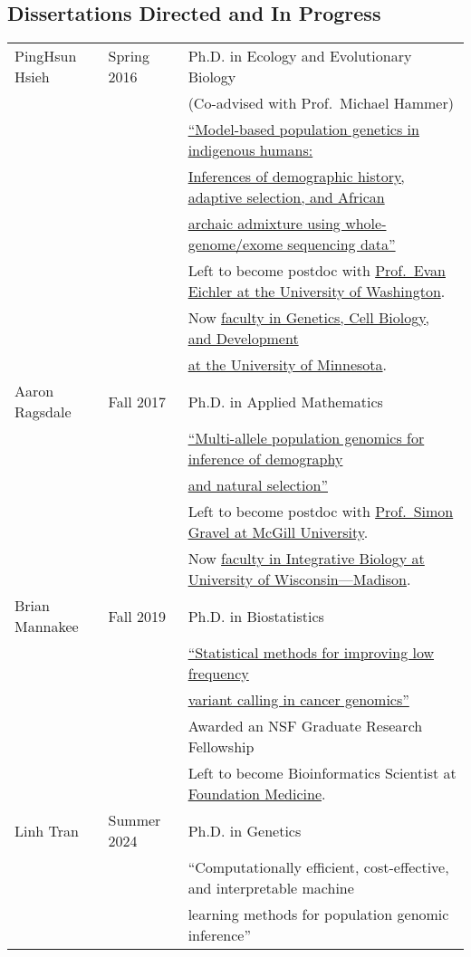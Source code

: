 \documentclass[11pt]{article}
\begin{document}
\subsection*{Dissertations Directed and In Progress}
\begin{longtable}[l]{l l l}
PingHsun Hsieh & Spring 2016 & Ph.D. in Ecology and Evolutionary Biology\\
 & & (Co-advised with Prof.\ Michael Hammer)\\
 & & \href{http://hdl.handle.net/10150/612540}{``Model-based population genetics in indigenous humans:}\\
 &&\href{http://hdl.handle.net/10150/612540}{Inferences of demographic history, adaptive selection, and African}\\
 &&\href{http://hdl.handle.net/10150/612540}{archaic admixture using whole-genome/exome sequencing data''}\\
 && Left to become postdoc with \href{https://eichlerlab.gs.washington.edu/}{Prof.\ Evan Eichler at the University of Washington}.\\
 && Now \href{https://hsiehph.github.io/}{faculty in Genetics, Cell Biology, and Development}\\
 && \href{https://hsiehph.github.io/}{at the University of Minnesota}.\\
Aaron Ragsdale & Fall 2017 & Ph.D. in Applied Mathematics\\
& & \href{http://hdl.handle.net/10150/622993}{``Multi-allele population genomics for inference of demography}\\
&&\href{http://hdl.handle.net/10150/622993}{and natural selection''}\\
&& Left to become postdoc with \href{http://simongravel.lab.mcgill.ca/}{Prof.\ Simon Gravel at McGill University}.\\
&&Now \href{https://apragsdale.github.io/}{faculty in Integrative Biology at University of Wisconsin—Madison}.\\
Brian Mannakee & Fall 2019 & Ph.D. in Biostatistics\\
& &\href{http://hdl.handle.net/10150/637708}{``Statistical methods for improving low frequency}\\
&&\href{http://hdl.handle.net/10150/637708}{variant calling in cancer genomics''}\\
&&Awarded an NSF Graduate Research Fellowship\\
&&Left to become Bioinformatics Scientist at \href{https://www.foundationmedicine.com}{Foundation Medicine}.\\ 
Linh Tran & Summer 2024 & Ph.D. in Genetics\\
&&``Computationally efficient, cost-effective, and interpretable machine\\
&&learning methods for population genomic inference''\\
 \end{longtable}
\end{document}
